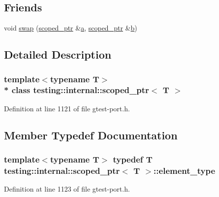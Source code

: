 \subsection*{Friends}
\begin{DoxyCompactItemize}
\item 
void \hyperlink{classtesting_1_1internal_1_1scoped__ptr_a01bc0441e6a3ebf26807ac523392ca86}{swap} (\hyperlink{classtesting_1_1internal_1_1scoped__ptr}{scoped\+\_\+ptr} \&\hyperlink{_07copy_08_2_read_camera_model_8m_a551a3d351eadcc0b9b1a2f24f0fb5ea0}{a}, \hyperlink{classtesting_1_1internal_1_1scoped__ptr}{scoped\+\_\+ptr} \&\hyperlink{jquery_8js_a2fa551895933fae935a0a6b87282241d}{b})
\end{DoxyCompactItemize}


\subsection{Detailed Description}
\subsubsection*{template$<$typename T$>$\\*
class testing\+::internal\+::scoped\+\_\+ptr$<$ T $>$}



Definition at line 1121 of file gtest-\/port.\+h.



\subsection{Member Typedef Documentation}
\subsubsection[{\texorpdfstring{element\+\_\+type}{element_type}}]{\setlength{\rightskip}{0pt plus 5cm}template$<$typename T$>$ typedef {\bf T} {\bf testing\+::internal\+::scoped\+\_\+ptr}$<$ {\bf T} $>$\+::{\bf element\+\_\+type}}\hypertarget{classtesting_1_1internal_1_1scoped__ptr_ae755ffeebada8e20b68c1d1ffa91cf13}{}\label{classtesting_1_1internal_1_1scoped__ptr_ae755ffeebada8e20b68c1d1ffa91cf13}


Definition at line 1123 of file gtest-\/port.\+h.



